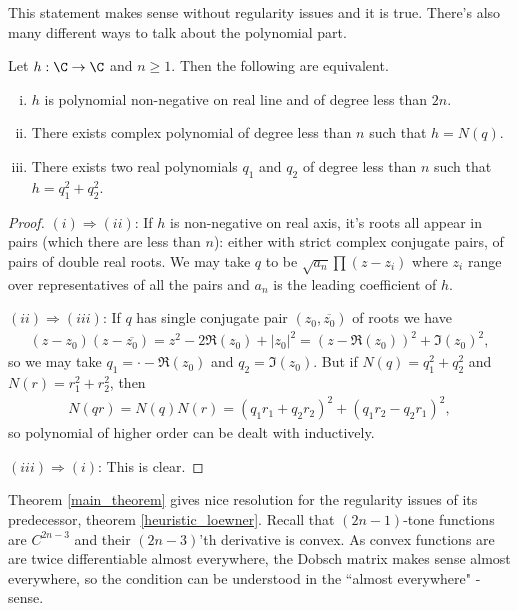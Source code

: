 This statement makes sense without regularity issues and it is true. There's also many different ways to talk about the polynomial part.
\begin{lem}\label{polynomial_lemma}
	Let $h : \C \to \C$ and $n \geq 1$. Then the following are equivalent.
	\begin{enumerate}[(i)]
		\item $h$ is polynomial non-negative on real line and of degree less than $2 n$.
		\item There exists complex polynomial of degree less than $n$ such that $h = N(q)$.
		\item There exists two real polynomials $q_{1}$ and $q_{2}$ of degree less than $n$ such that $h = q_{1}^2 + q_{2}^2$.
	\end{enumerate}
\end{lem}
\begin{proof}
	$(i) \Rightarrow (ii)$: If $h$ is non-negative on real axis, it's roots all appear in pairs (which there are less than $n$): either with strict complex conjugate pairs, of pairs of double real roots. We may take $q$ to be $\sqrt{a_{n}}\prod (z - z_{i})$ where $z_{i}$ range over representatives of all the pairs and $a_{n}$ is the leading coefficient of $h$.

	$(ii) \Rightarrow (iii)$: If $q$ has single conjugate pair $(z_{0}, \overline{z_{0}})$ of roots we have
	\begin{align*}
		(z - z_{0}) (z - \overline{z_{0}}) = z^2 - 2 \Re(z_{0}) + |z_{0}|^2 = (z - \Re(z_{0}))^2 + \Im(z_{0})^2,
	\end{align*}
	so we may take $q_{1} = \cdot - \Re(z_{0})$ and $q_{2} = \Im(z_{0})$. But if $ N(q) = q_{1}^2 + q_{2}^2$ and $ N(r) = r_{1}^2 + r_{2}^2$, then
	\begin{align*}
		N(q r) = N(q) N(r) = (q_{1} r_{1} + q_{2} r_{2})^2 + (q_{1} r_{2} - q_{2} r_{1})^2,
	\end{align*}
	so polynomial of higher order can be dealt with inductively.

	$(iii) \Rightarrow (i)$: This is clear.
\end{proof}

Theorem \ref{main_theorem} gives nice resolution for the regularity issues of its predecessor, theorem \ref{heuristic_loewner}. Recall that $(2 n - 1)$-tone functions are $C^{2 n - 3}$ and their $(2 n - 3)$'th derivative is convex. As convex functions are are twice differentiable almost everywhere, the Dobsch matrix makes sense almost everywhere, so the condition can be understood in the ``almost everywhere" -sense.


